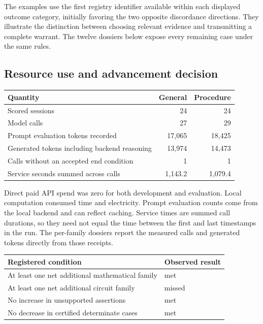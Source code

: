 \documentclass[12pt,letterpaper]{article}
\begin{document}
The examples use the first registry identifier available within each displayed outcome category, initially favoring the two opposite discordance directions. They illustrate the distinction between choosing relevant evidence and transmitting a complete warrant. The twelve dossiers below expose every remaining case under the same rules.

\subsection{Resource use and advancement decision}

\begin{center}\footnotesize\setlength{\tabcolsep}{4pt}\begin{tabularx}{\linewidth}{Yrr}\toprule
Quantity & General & Procedure\\\midrule
Scored sessions & 24 & 24\\
Model calls & 27 & 29\\
Prompt evaluation tokens recorded & 17,065 & 18,425\\
Generated tokens including backend reasoning & 13,974 & 14,473\\
Calls without an accepted end condition & 1 & 1\\
Service seconds summed across calls & 1,143.2 & 1,079.4\\
\bottomrule\end{tabularx}\end{center}


Direct paid API spend was zero for both development and evaluation. Local computation consumed time and electricity. Prompt evaluation counts come from the local backend and can reflect caching. Service times are summed call durations, so they need not equal the time between the first and last timestamps in the run. The per-family dossiers report the measured calls and generated tokens directly from those receipts.

\begin{center}\footnotesize\setlength{\tabcolsep}{4pt}\begin{tabularx}{\linewidth}{Yl}\toprule
Registered condition & Observed result\\\midrule
At least one net additional mathematical family & met\\
At least one net additional circuit family & missed\\
No increase in unsupported assertions & met\\
No decrease in certified determinate cases & met\\
\bottomrule\end{tabularx}\end{center}
\end{document}
